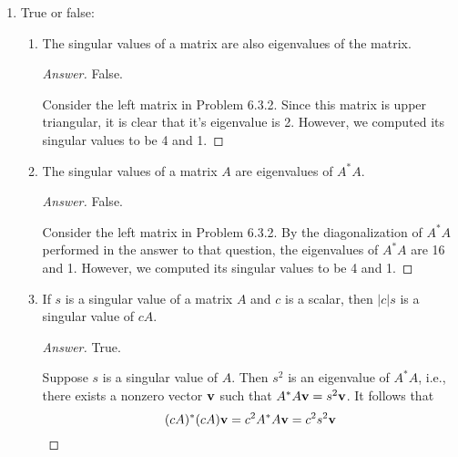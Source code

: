 \documentclass[../psets.tex]{subfiles}
\begin{document}
\begin{enumerate}[label={\textbf{3.\arabic*.}}]
\begin{proof}[Answer]
        By Theorem 6.3.5, $A=U|A|$ where $U$ is an isometry. Note that $U$ is unitary in this case as well since $U$ is square (see Proposition 5.6.3). Also note that $\det|A|$ is nonnegative since every eigenvalue of $|A|$ (i.e., the singular values) are nonnegative by definition. Thus,
        \begin{align*}
            |\det A| &= |\det(U|A|)|\\
            &= |\det U|\cdot|\det|A||\tag*{Theorem 3.3.5}\\
            &= 1\cdot|\det|A||\tag*{Proposition 5.6.4}\\
            &= \det|A|
        \end{align*}
        as desired.
    \end{proof}
    \item True or false:
    \begin{enumerate}
        \item The singular values of a matrix are also eigenvalues of the matrix.
        \begin{proof}[Answer]
            False.\par
            Consider the left matrix in Problem 6.3.2. Since this matrix is upper triangular, it is clear that it's eigenvalue is 2. However, we computed its singular values to be 4 and 1.
        \end{proof}
        \item The singular values of a matrix $A$ are eigenvalues of $A^*A$.
        \begin{proof}[Answer]
            False.\par
            Consider the left matrix in Problem 6.3.2. By the diagonalization of $A^*A$ performed in the answer to that question, the eigenvalues of $A^*A$ are 16 and 1. However, we computed its singular values to be 4 and 1.
        \end{proof}
        \item If $s$ is a singular value of a matrix $A$ and $c$ is a scalar, then $|c|s$ is a singular value of $cA$.
        \begin{proof}[Answer]
            True.\par
            Suppose $s$ is a singular value of $A$. Then $s^2$ is an eigenvalue of $A^*A$, i.e., there exists a nonzero vector $\mathbf{v}$ such that $A^*A\mathbf{v}=s^2\mathbf{v}$. It follows that
            \begin{equation*}
                (cA)^*(cA)\mathbf{v} = c^2A^*A\mathbf{v} = c^2s^2\mathbf{v}
            \end{equation*}

\end{proof}
\end{enumerate}
\end{enumerate}
\end{document}
